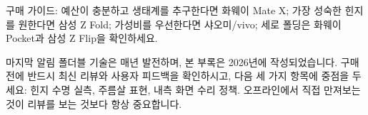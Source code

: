 구매 가이드: 예산이 충분하고 생태계를 추구한다면 화웨이 Mate X; 가장 성숙한 힌지를 원한다면 삼성 Z Fold; 가성비를 우선한다면 샤오미/vivo; 세로 폴딩은 화웨이 Pocket과 삼성 Z Flip을 확인하세요.

\begin{tcbinfo}{마지막 알림}
폴더블 기술은 매년 발전하며, 본 부록은 2026년에 작성되었습니다. 구매 전에 반드시 최신 리뷰와 사용자 피드백을 확인하시고, 다음 세 가지 항목에 중점을 두세요: 힌지 수명 실측, 주름살 표현, 내측 화면 수리 정책. 오프라인에서 직접 만져보는 것이 리뷰를 보는 것보다 항상 중요합니다.

\end{tcbinfo}

